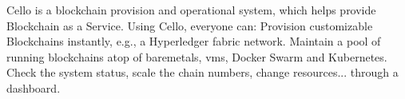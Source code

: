 Cello is a blockchain provision and operational system, which helps provide Blockchain as a Service.
Using Cello, everyone can:
Provision customizable Blockchains instantly, e.g., a Hyperledger fabric network.
Maintain a pool of running blockchains atop of baremetals, vms, Docker Swarm and Kubernetes.
Check the system status, scale the chain numbers, change resources... through a dashboard.
